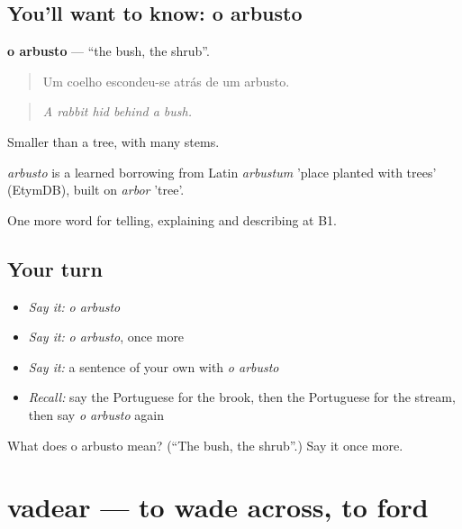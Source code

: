 \subsection*{You'll want to know: o arbusto}
\textbf{o arbusto} — \textquotedblleft{}the bush, the shrub\textquotedblright{}.

\begin{quote}
Um coelho escondeu-se atrás de um arbusto.
\end{quote}

\begin{quote}
\emph{A rabbit hid behind a bush.}
\end{quote}

Smaller than a tree, with many stems.

\begin{cousinweb}
\emph{arbusto} is a learned borrowing from Latin \emph{arbustum} 'place planted with trees' (EtymDB), built on \emph{arbor} 'tree'.
\end{cousinweb}

\begin{grammarlens}[title={What you've built}]
One more word for telling, explaining and describing at B1.
\end{grammarlens}

\subsection*{Your turn}
\begin{itemize}
\raggedright
  \item \emph{Say it:} \emph{o arbusto}
  \item \emph{Say it:} \emph{o arbusto}, once more
  \item \emph{Say it:} a sentence of your own with \emph{o arbusto}
  \item \emph{Recall:} say the Portuguese for the brook, then the Portuguese for the stream, then say \emph{o arbusto} again
\end{itemize}

\begin{tcolorbox}[breakable,colback=teal!4,colframe=teal!35!black,title={Before you move on}]
What does o arbusto mean? (\textquotedblleft{}The bush, the shrub\textquotedblright{}.) Say it once more.
\end{tcolorbox}
\section[vadear]{vadear — to wade across, to ford}

